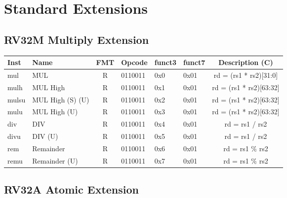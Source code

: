 \section*{Standard Extensions}

\subsection*{RV32M Multiply Extension}
\begin{center}
\begin{tabular}
{| T | l | c | T | T | T | C |} \hline
\rmfamily Inst & Name              & FMT & \rmfamily Opcode & \rmfamily funct3 & \rmfamily funct7 & \rmfamily Description (C)     \\ \hline
mul      & MUL               & R   & 0110011    & 0x0    & 0x01   & rd = (rs1 * rs2)[31:0]  \\
mulh     & MUL High          & R   & 0110011    & 0x1    & 0x01   & rd = (rs1 * rs2)[63:32] \\
mulsu    & MUL High (S) (U)  & R   & 0110011    & 0x2    & 0x01   & rd = (rs1 * rs2)[63:32] \\
mulu     & MUL High (U)      & R   & 0110011    & 0x3    & 0x01   & rd = (rs1 * rs2)[63:32] \\
div      & DIV               & R   & 0110011    & 0x4    & 0x01   & rd = rs1 / rs2          \\
divu     & DIV (U)           & R   & 0110011    & 0x5    & 0x01   & rd = rs1 / rs2          \\
rem      & Remainder         & R   & 0110011    & 0x6    & 0x01   & rd = rs1 \% rs2         \\
remu     & Remainder (U)     & R   & 0110011    & 0x7    & 0x01   & rd = rs1 \% rs2         \\
\hline
\end{tabular}
\end{center}

\subsection*{RV32A Atomic Extension}


